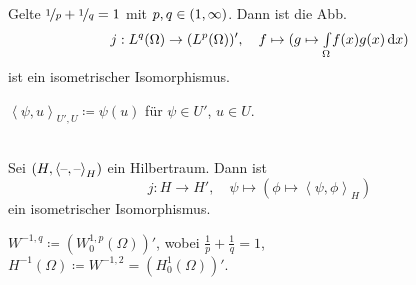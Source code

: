 \documentclass{cheat-sheet}
\newcommand{\IntOmega}[2]{\AInt{\Omega}{#1}{#2}} %
\newcommand{\scp}[2]{\left\langle #1 , #2 \right\rangle} %
\begin{document}
\begin{bsp}
  Gelte $\nicefrac{1}{p} + \nicefrac{1}{q} = 1$ mit $p, q \in \left( 1, \infty \right)$.
  Dann ist die Abb.
  \[
    j : L^q(\Omega) \to (L^p(\Omega))', \quad
    f \mapsto (g \mapsto \IntOmega{f(x) g(x)}{x})
  \]
  ist ein isometrischer Isomorphismus.
\end{bsp}

\begin{nota}
  $\scp{\psi}{u}_{U', U} \coloneqq \psi(u)$ \enspace für $\psi \in U'$, $u \in U$.
\end{nota}

\begin{satz} \mbox{} \\
  Sei $(H, \scp{\blank}{\blank}_H)$ ein Hilbertraum.
  Dann ist 
  \[
    j : H \to H', \quad
    \psi \mapsto (\phi \mapsto \scp{\psi}{\phi}_H)
  \]
  ein isometrischer Isomorphismus.
\end{satz}

\begin{defn}
  \begin{minipage}[t]{0.8 \linewidth}
    $W^{-1,q} \coloneqq (W_0^{1,p}(\Omega))'$, wobei $\tfrac{1}{p} + \tfrac{1}{q} = 1$, \\
    $H^{-1}(\Omega) \coloneqq W^{-1,2} = (H_0^1(\Omega))'$.
  \end{minipage}
\end{defn}
\end{document}
